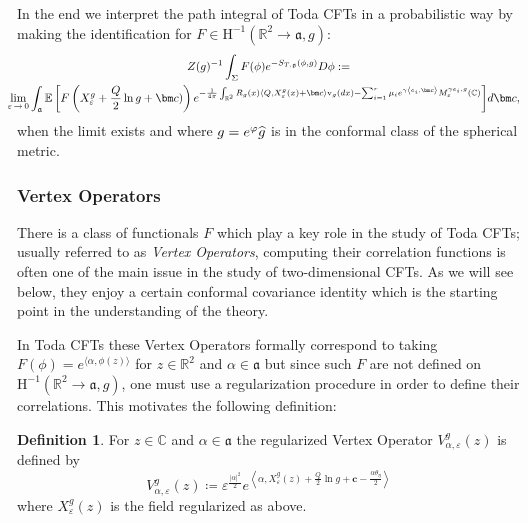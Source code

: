 \documentclass[10pt]{amsart}
\theoremstyle{definition}\newtheorem{defi}[theo]{Definition}\newtheorem{rema}[theo]{Remark}\newtheorem{exam}[theo]{Example}\newtheorem{exem}[theo]{Example}\newtheorem{nota}[theo]{Notation}
\newcommand{\frkg}{\mathfrak{g}}
\newcommand{\frka}{\mathfrak{a}}
\newcommand{\rmv}{\mathrm{v}}
\newcommand{\rmH}{\mathrm{H}}
\newcommand{\C}{\mathbb{C}}
\newcommand{\R}{\mathbb{R}}
\newcommand{\E}{\mathbb{E}}
\newcommand{\ps}[1]{\langle #1 \rangle}
\newcommand*\eps{\varepsilon}
\newcommand*\green[1]{#1}
\let\oldhat\hat
\renewcommand*{\hat}[1]{\mathchoice{\widehat{#1}}{\widehat{#1}}{\oldhat{#1}}{\oldhat{#1}}}
\begin{document}
In the end we interpret the path integral of Toda CFTs in a probabilistic way by making the identification for $F \in \rmH^{-1}(\R^2\to\frka,g)$:
\begin{multline}\label{def:TPI}
Z(g)^{-1} \int_\Sigma F(\phi)e^{-S_{T,\frkg}(\phi,g) }D\phi:=\\
\mkern-15mu\lim\limits_{\eps\,\rightarrow\,0}\int_{\frka}\E\left[F\left(X^g_\eps+\frac Q2\ln g+\bm c)\right)e^{-\frac{1}{4 \pi} \int_{\R^2} R_g(x) \left\langle Q, X^g_\eps(x)+\bm c \right\rangle \rmv_ g(dx) -\sum_{i=1}^{r} \mu_i e^{\gamma \left\langle e_i, \bm c\right\rangle}M^{ \gamma e_i,g}_\eps(\C) }\right]\!d\bm c,
\end{multline}
when the limit exists and where $g=e^{\varphi}\hat g$ is in the conformal class of the spherical metric.

\subsubsection{Vertex Operators}\label{vertex}
There is a class of functionals $F$ which play a key role in the study of Toda CFTs; usually referred to as \emph{Vertex Operators}, computing their correlation functions is often one of the main issue in the study of two-dimensional CFTs. As we will see below, they enjoy a certain conformal covariance identity which is the starting point in the understanding of the theory.

In Toda CFTs these Vertex Operators formally correspond to taking $F(\phi)=e^{\ps{\alpha,\green\phi(z)}}$ for $z\in\R^2$ and $\alpha\in\frka$ but since such $F$ are not defined on $\rmH^{-1}(\R^2\to\frka,g)$, one must use a regularization procedure in order to define their correlations. This motivates the following definition:
\begin{defi}
For $z\in \C$ and $\alpha\in \frka$ the regularized Vertex Operator $V^g_{\alpha,\eps}(z)$ is defined by
\begin{equation}
V^g_{\alpha,\eps}(z)\coloneqq \eps^{\frac{|\alpha|^2}{2}} e^{\left\langle\alpha, X^g_\eps(z) + \frac Q2\ln g+\bm c-\frac{\alpha\theta_{\eta}}2\right\rangle}
\end{equation}
where $X^g_\eps(z)$ is the field regularized as above.
\end{defi}
\end{document}
